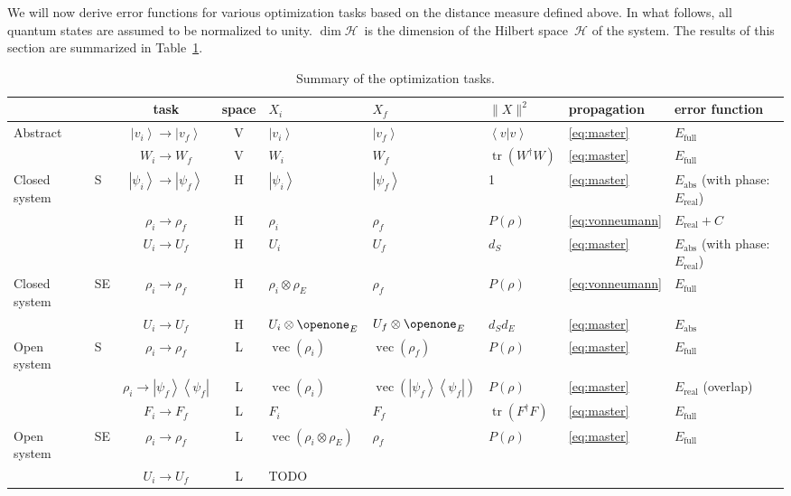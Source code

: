 \documentclass[aps, pra, a4paper, longbibliography, superscriptaddress]{revtex4-1}
\newcommand{\I}{\openone}
\newcommand{\ket}[1]{\left| #1 \right \rangle}
\newcommand{\braket}[2]{\left \langle #1 | #2 \right \rangle}
\newcommand{\ketbra}[2]{\left| #1 \right \rangle \left \langle #2 \right|}
\newcommand{\hilb}[1]{\mathcal{#1}}
\DeclareMathOperator{\tr}{tr}
\DeclareMathOperator{\cvec}{vec}
\begin{document}
We will now derive error functions for various optimization tasks
based on the distance measure defined above.
In what follows, all quantum states are assumed to be normalized to
unity. $\dim \hilb{H}$~is the dimension of the Hilbert space~$\hilb{H}$ of the system.
The results of this section are summarized in Table~\ref{table:tasks}.



\begin{table}
\begin{tabular}{ll|c|c|l|l|l|l|l}
& & task & space & $X_i$ & $X_f$ & $\|X\|^2$ & propagation & error function\\
\hline
Abstract &
& $\ket{v_i} \to \ket{v_f}$ & V
& $\ket{v_i}$ &$\ket{v_f}$ & $\braket{v}{v}$ &
\eqref{eq:master} & $E_\text{full}$\\
& & $W_i \to W_f$ & V
& $W_i$ & $W_f$ & $\tr(W^\dagger W)$ &
\eqref{eq:master} & $E_\text{full}$\\
\hline
Closed system & S
& $\ket{\psi_i} \to \ket{\psi_f}$ & H
& $\ket{\psi_i}$ & $\ket{\psi_f}$ & 1 &
\eqref{eq:master} & $E_\text{abs}$ (with phase: $E_\text{real}$)\\
& & $\rho_i \to \rho_f$ & H
& $\rho_i$ & $\rho_f$ & $P(\rho)$ &
\eqref{eq:vonneumann} & $E_\text{real} + C$\\
& & $U_i \to U_f$ & H
& $U_i$ & $U_f$ & $d_S$ &
\eqref{eq:master} & $E_\text{abs}$ (with phase: $E_\text{real}$)\\
\hline
Closed system & SE
& $\rho_i \to \rho_f$ & H
& $\rho_i \otimes \rho_E$ & $\rho_f$ & $P(\rho)$ &
\eqref{eq:vonneumann} & $E_\text{full}$\\
& & $U_i \to U_f$ & H
& $U_i \otimes \I_E$ & $U_f \otimes \I_E$ & $d_S d_E$ &
\eqref{eq:master} & $E_\text{abs}$\\
\hline
Open system & S
& $\rho_i \to \rho_f$ & L & $\cvec(\rho_i)$ & $\cvec(\rho_f)$ & $P(\rho)$ &
\eqref{eq:master} & $E_\text{full}$\\
& & $\rho_i \to \ketbra{\psi_f}{\psi_f}$ & L
& $\cvec(\rho_i)$ & $\cvec(\ketbra{\psi_f}{\psi_f})$ & $P(\rho)$ &
\eqref{eq:master} & $E_\text{real}$ (overlap)\\
& & $F_i \to F_f$ & L & $F_i$ & $F_f$ & $\tr(F^\dagger F)$ &
\eqref{eq:master} & $E_\text{full}$\\
\hline
Open system & SE
& $\rho_i \to \rho_f$ & L
& $\cvec(\rho_i \otimes \rho_E)$ & $\rho_f$ & $P(\rho)$ &
\eqref{eq:master} & $E_\text{full}$\\
& & $U_i \to U_f$ & L & TODO
\end{tabular}
\caption{Summary of the optimization tasks.
\label{table:tasks}
}
\end{table}
\end{document}
